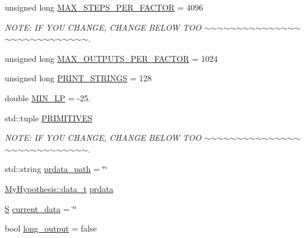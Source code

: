\begin{DoxyCompactItemize}
\item 
unsigned long \hyperlink{_formal_language_theory-_complex_2_main_8cpp_a33cfa353d2570ba1bc9b45b924e890ff}{M\+A\+X\+\_\+\+S\+T\+E\+P\+S\+\_\+\+P\+E\+R\+\_\+\+F\+A\+C\+T\+OR} = 4096
\begin{DoxyCompactList}\small\item\em N\+O\+TE\+: IF Y\+OU C\+H\+A\+N\+GE, C\+H\+A\+N\+GE B\+E\+L\+OW T\+OO $\sim$$\sim$$\sim$$\sim$$\sim$$\sim$$\sim$$\sim$$\sim$$\sim$$\sim$$\sim$$\sim$$\sim$$\sim$$\sim$$\sim$$\sim$$\sim$$\sim$$\sim$$\sim$$\sim$$\sim$$\sim$$\sim$$\sim$$\sim$. \end{DoxyCompactList}\item 
unsigned long \hyperlink{_formal_language_theory-_complex_2_main_8cpp_a78ab994cd90dbad4d470e8b4082ef882}{M\+A\+X\+\_\+\+O\+U\+T\+P\+U\+T\+S\+\_\+\+P\+E\+R\+\_\+\+F\+A\+C\+T\+OR} = 1024
\item 
unsigned long \hyperlink{_formal_language_theory-_complex_2_main_8cpp_ad098fee1c76be478fe0683197334c489}{P\+R\+I\+N\+T\+\_\+\+S\+T\+R\+I\+N\+GS} = 128
\item 
double \hyperlink{_formal_language_theory-_complex_2_main_8cpp_aeefd72efb701ee22e6d0c6755d8596b2}{M\+I\+N\+\_\+\+LP} = -\/25.
\item 
std\+::tuple \hyperlink{_formal_language_theory-_complex_2_main_8cpp_a04e6d8e4b74d3f4fc965e5e5449158a3}{P\+R\+I\+M\+I\+T\+I\+V\+ES}
\begin{DoxyCompactList}\small\item\em N\+O\+TE\+: IF Y\+OU C\+H\+A\+N\+GE, C\+H\+A\+N\+GE B\+E\+L\+OW T\+OO $\sim$$\sim$$\sim$$\sim$$\sim$$\sim$$\sim$$\sim$$\sim$$\sim$$\sim$$\sim$$\sim$$\sim$$\sim$$\sim$$\sim$$\sim$$\sim$$\sim$$\sim$$\sim$$\sim$$\sim$$\sim$$\sim$$\sim$$\sim$. \end{DoxyCompactList}\item 
std\+::string \hyperlink{_formal_language_theory-_complex_2_main_8cpp_aad659d32cecc0fd81857e5dbb67e0b1c}{prdata\+\_\+path} = \char`\"{}\char`\"{}
\item 
\hyperlink{class_bayesable_aa2788c4d7718c0a824e1d28c4c98f921}{My\+Hypothesis\+::data\+\_\+t} \hyperlink{_formal_language_theory-_complex_2_main_8cpp_af877d2e50caacf995a851274343f46c5}{prdata}
\item 
\hyperlink{_formal_language_theory-_complex_2_main_8cpp_a51c40915539205f0b5add30b0d68a4cb}{S} \hyperlink{_formal_language_theory-_complex_2_main_8cpp_a7738aad53d0b772202992e9bad69c250}{current\+\_\+data} = \char`\"{}\char`\"{}
\item 
bool \hyperlink{_formal_language_theory-_complex_2_main_8cpp_a41b29b6499f37ab86060debf9c58d19f}{long\+\_\+output} = false
\end{DoxyCompactItemize}


